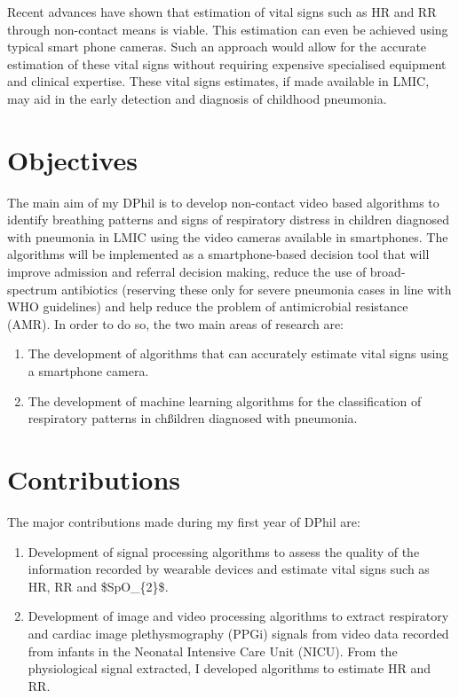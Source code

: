 Recent advances have shown that estimation of vital signs such as HR and RR through non-contact means is viable. This estimation can even be achieved using typical smart phone cameras. Such an approach would allow for the accurate estimation of these vital signs without requiring expensive specialised equipment and clinical expertise. These vital signs estimates, if made available in LMIC, may aid in the early detection and diagnosis of childhood pneumonia. 

\section{Objectives}

The main aim of my DPhil is to develop non-contact video based algorithms to identify breathing patterns and signs of respiratory distress in children diagnosed with pneumonia in LMIC using the video cameras available in smartphones. The algorithms will be implemented as a smartphone-based decision tool that will improve admission and referral decision making, reduce the use of broad-spectrum antibiotics (reserving these only for severe pneumonia cases in line with WHO guidelines) and help reduce the problem of antimicrobial resistance (AMR).  In order to do so, the two main areas of research are:

\begin{enumerate}
\item The development of algorithms that can accurately estimate vital signs using a smartphone camera.
\item The development of machine learning algorithms for the classification of respiratory patterns in chßildren diagnosed with pneumonia.
\end{enumerate}

\section{Contributions}

The major contributions made during my first year of DPhil are:

 \begin{enumerate}
\item Development of signal processing algorithms to assess the quality of the information recorded by wearable devices and estimate vital signs such as HR, RR and \gls{$SpO_{2}$}.

\item Development of image and video processing algorithms to extract respiratory and cardiac image plethysmography (PPGi) signals from video data recorded from infants in the Neonatal Intensive Care Unit (NICU). From the physiological signal extracted, I developed algorithms to estimate HR and RR.
\end{enumerate}

